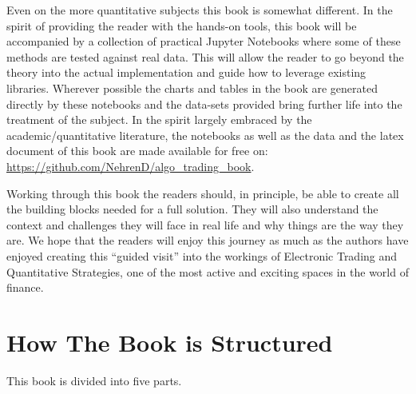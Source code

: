 Even on the more quantitative subjects this book is somewhat different. In the spirit of providing the reader with the hands-on tools, this book will be accompanied by a collection of practical Jupyter Notebooks where some of these methods are tested against real data. This will allow the reader to go beyond the theory into the actual implementation and guide how to leverage existing libraries. Wherever possible the charts and tables in the book are generated directly by these notebooks and the data-sets provided bring further life into the treatment of the subject. In the spirit largely embraced by the academic/quantitative literature, the notebooks as well as the data and the latex document of this book are made  available for free on: \url{https://github.com/NehrenD/algo_trading_book}.


Working through this book the readers should, in principle, be able to create all the building blocks needed for a full solution. They will also understand the context and challenges they will face in real life and why things are the way they are. We hope that the readers will enjoy this journey as much as the authors have enjoyed creating this ``guided visit'' into the workings of Electronic Trading and Quantitative Strategies, one of the most active and exciting spaces in the world of finance.



\section{How The Book is Structured}

This book is divided into five parts. 


